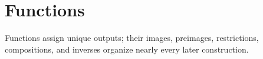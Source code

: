 \section{Functions}

Functions assign unique outputs; their images, preimages, restrictions, compositions, and inverses organize nearly every later construction.






